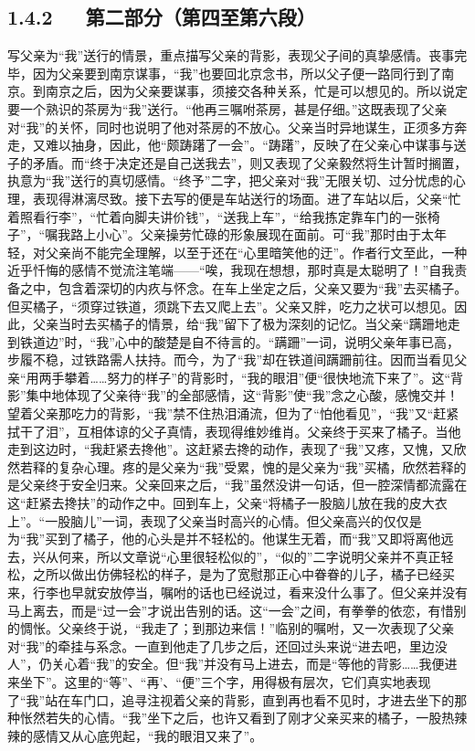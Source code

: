 \documentclass[letterpaper,10pt,english]{sphinxmanual}
\begin{document}
\subsection{1.4.2   第二部分（第四至第六段）}
\label{\detokenize{p01_u6563_u6587/_u6731_u81ea_u6e05-_u80cc_u5f71:id8}}
写父亲为“我”送行的情景，重点描写父亲的背影，表现父子间的真挚感情。丧事完毕，因为父亲要到南京谋事，“我”也要回北京念书，所以父子便一路同行到了南京。到南京之后，因为父亲要谋事，须接交各种关系，忙是可以想见的。所以说定要一个熟识的茶房为“我”送行。“他再三嘱咐茶房，甚是仔细。”这既表现了父亲对“我”的关怀，同时也说明了他对茶房的不放心。父亲当时异地谋生，正须多方奔走，又难以抽身，因此，他“颇踌躇了一会”。“踌躇”，反映了在父亲心中谋事与送子的矛盾。而“终于决定还是自己送我去”，则又表现了父亲毅然将生计暂时搁置，执意为“我”送行的真切感情。“终予”二字，把父亲对“我”无限关切、过分忧虑的心理，表现得淋漓尽致。接下去写的便是车站送行的场面。进了车站以后，父亲“忙着照看行李”，“忙着向脚夫讲价钱”，“送我上车”，“给我拣定靠车门的一张椅子”，“嘱我路上小心”。父亲操劳忙碌的形象展现在面前。可“我”那时由于太年轻，对父亲尚不能完全理解，以至于还在“心里暗笑他的迂”。作者行文至此，一种近乎忏悔的感情不觉流注笔端——“唉，我现在想想，那时真是太聪明了！”自我责备之中，包含着深切的内疚与怀念。在车上坐定之后，父亲又要为“我”去买橘子。但买橘子，“须穿过铁道，须跳下去又爬上去”。父亲又胖，吃力之状可以想见。因此，父亲当时去买橘子的情景，给“我”留下了极为深刻的记忆。当父亲“蹒跚地走到铁道边”时，“我”心中的酸楚是自不待言的。“蹒跚”一词，说明父亲年事已高，步履不稳，过铁路需人扶持。而今，为了“我”却在铁道间蹒跚前往。因而当看见父亲“用两手攀着……努力的样子”的背影时，“我的眼泪”便“很快地流下来了”。这“背影”集中地体现了父亲待“我”的全部感情，这“背影”使“我”念之心酸，感愧交并！望着父亲那吃力的背影，“我”禁不住热泪涌流，但为了“怕他看见”，“我”又“赶紧拭干了泪”，互相体谅的父子真情，表现得维妙维肖。父亲终于买来了橘子。当他走到这边时，“我赶紧去搀他”。这赶紧去搀的动作，表现了“我”又疼，又愧，又欣然若释的复杂心理。疼的是父亲为“我”受累，愧的是父亲为“我”买橘，欣然若释的是父亲终于安全归来。父亲回来之后，“我”虽然没讲一句话，但一腔深情都流露在这“赶紧去搀扶”的动作之中。回到车上，父亲“将橘子一股脑儿放在我的皮大衣上”。“一股脑儿”一词，表现了父亲当时高兴的心情。但父亲高兴的仅仅是为“我”买到了橘子，他的心头是并不轻松的。他谋生无着，而“我”又即将离他远去，兴从何来，所以文章说“心里很轻松似的”，“似的”二字说明父亲并不真正轻松，之所以做出仿佛轻松的样子，是为了宽慰那正心中眷眷的儿子，橘子已经买来，行李也早就安放停当，嘱咐的话也已经说过，看来没什么事了。但父亲并没有马上离去，而是“过一会”才说出告别的话。这“一会”之间，有拳拳的依恋，有惜别的惆怅。父亲终于说，“我走了；到那边来信！”临别的嘱咐，又一次表现了父亲对“我”的牵挂与系念。一直到他走了几步之后，还回过头来说“进去吧，里边没人”，仍关心着“我”的安全。但“我”并没有马上进去，而是“等他的背影……我便进来坐下”。这里的“等”、“再’、“便”三个字，用得极有层次，它们真实地表现了“我”站在车门口，追寻注视着父亲的背影，直到再也看不见时，才进去坐下的那种怅然若失的心情。“我”坐下之后，也许又看到了刚才父亲买来的橘子，一股热辣辣的感情又从心底兜起，“我的眼泪又来了”。
\end{document}
